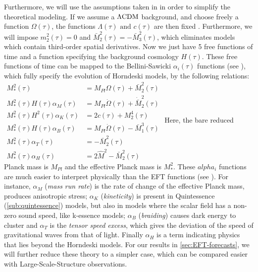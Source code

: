 Furthermore, we will use the assumptions taken in \cite{planck_collaboration_planck_2016} in order to simplify
the theoretical modeling.
If we assume a $\Lambda\mathrm{CDM}$ background, and choose freely a function
$\Omega(\tau)$, the functions $\Lambda(\tau) \textrm{ and } c(\tau)$ are then fixed \cite{cite Hu 2014}.
Furthermore, we will impose $ m^2_2(\tau) = 0$ and $ \bar{M}_2^2 (\tau) = - \bar{M}_3^2 (\tau)$,
which eliminates models which contain third-order spatial derivatives.
Now we just have 5 free functions of time and a function specifying the background cosmology $H(\tau)$.
These free functions of time can be mapped to the Bellini-Sawicki $\alpha_i (\tau)$ 
functions (see \cite{bellini-sawicki}),
which fully specify the evolution of Horndeski models, by the following relations:
\beeqal$
\begin{split}
M_{*}^2 (\tau) & = M_{Pl}\Omega(\tau) + \bar{M}_2^2 (\tau) \\
M_{*}^2 (\tau) H(\tau) \alpha_M (\tau)   & = M_{Pl}\dot{\Omega}(\tau) + \dot{\bar{M}}_2^2 (\tau) \\
M_{*}^2 (\tau) H^2(\tau) \alpha_K (\tau)   & = 2 c (\tau) + M_2^4 (\tau) \\
M_{*}^2 (\tau) H(\tau) \alpha_B (\tau)   & = M_{Pl}\dot{\Omega}(\tau) - \bar{M}_{1}^3 (\tau)\\
M_{*}^2 (\tau) \alpha_T (\tau)   & = - \bar{M}_2^2 (\tau) \\
M_{*}^2 (\tau) \alpha_H (\tau)   & = 2 \hat{M}^2 - \bar{M}_2^2 (\tau)
\end{split}
$ 
Here, the bare reduced Planck mass is $M_{Pl}$ and the effective Planck mass is $ M_{*}^2 $.
These $alpha_i$ functions are much easier to interpret physically than the EFT functions (see \cite{bellini, sawicki}).
For instance, $\alpha_M$ (\emph{mass run rate}) is the rate of change of the effective Planck mass, 
produces anisotropic stress; $\alpha_K$ (\emph{kineticity}) is present in Quintessence (\cref{sub:quintessence}) models, 
but also in models where the scalar field has a non-zero sound speed, like k-essence models;
$\alpha_B$ (\emph{braiding}) causes dark energy to cluster and $\alpha_T$ is the \emph{tensor speed excess}, which gives the deviation
of the speed of gravitational waves from that of light.
Finally $\alpha_H$ is a term indicating physics that lies beyond the Horndeski models. 
For our results in \cref{sec:EFT-forecasts}, we will further reduce these theory to a simpler case, which can be compared easier with Large-Scale-Structure
observations.



